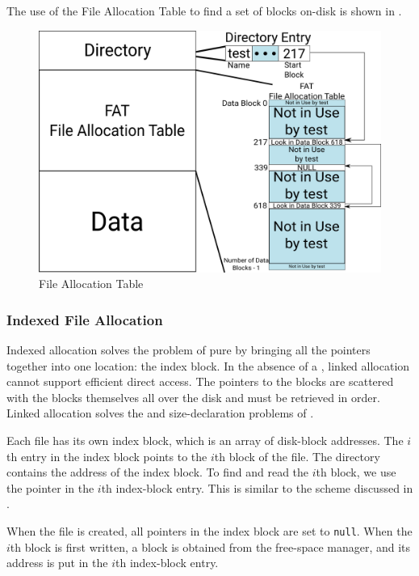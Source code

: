 The use of the File Allocation Table to find a set of blocks on-disk is shown in .
\begin{figure}[h!tbp]
  \centering
  \includegraphics[scale=0.9]{./Drawings/EDAF35-Operating_Systems/FAT.png}
  \caption{File Allocation Table}
  \label{fig:File_Allocation_Table}
\end{figure}

\subsubsection{Indexed File Allocation}\label{subsubsec:Indexed_File_Allocation}
Indexed allocation solves the problem of pure  by bringing all the pointers together into one location: the index block.
In the absence of a , linked allocation cannot support efficient direct access.
The pointers to the blocks are scattered with the blocks themselves all over the disk and must be retrieved in order.
Linked allocation solves the  and size-declaration problems of .

Each file has its own index block, which is an array of disk-block addresses.
The $i$th entry in the index block points to the $i$th block of the file.
The directory contains the address of the index block.
To find and read the $i$th block, we use the pointer in the $i$th index-block entry.
This is similar to the  scheme discussed in .

When the file is created, all pointers in the index block are set to \texttt{null}.
When the $i$th block is first written, a block is obtained from the free-space manager, and its address is put in the $i$th index-block entry.

